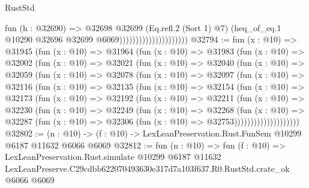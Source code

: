 \begin{lexlean}{RustStd}
\begin{coremodule}
                                          fun (h : @32690) =>
                                          @32698
                                            @32699
                                            (Eq.refl.{2} (Sort 1) @7)
                                            (heq_of_eq.{1}
                                              @10290
                                              @32696
                                              @32699
                                              @6069)))))))))))))))))))))
@32794 := fun (x : @10) =>
  @31945
    (fun (x : @10) =>
    @31964
      (fun (x : @10) =>
      @31983
        (fun (x : @10) =>
        @32002
          (fun (x : @10) =>
          @32021
            (fun (x : @10) =>
            @32040
              (fun (x : @10) =>
              @32059
                (fun (x : @10) =>
                @32078
                  (fun (x : @10) =>
                  @32097
                    (fun (x : @10) =>
                    @32116
                      (fun (x : @10) =>
                      @32135
                        (fun (x : @10) =>
                        @32154
                          (fun (x : @10) =>
                          @32173
                            (fun (x : @10) =>
                            @32192
                              (fun (x : @10) =>
                              @32211
                                (fun (x : @10) =>
                                @32230
                                  (fun (x : @10) =>
                                  @32249
                                    (fun (x : @10) =>
                                    @32268
                                      (fun (x : @10) =>
                                      @32287
                                        (fun (x : @10) =>
                                        @32306 (fun (x : @10) => @32753))))))))))))))))))))
@32802 := (n : @10) -> (f : @10) -> LexLeanPreservation.Rust.FunSem @10299 @6187 @11632 @6066 @6069
@32812 := fun (n : @10) =>
  fun (f : @10) =>
  LexLeanPreservation.Rust.simulate
    @10299
    @6187
    @11632
    LexLeanPreserve.C29cdbb622070493630e317d7a103f637.R0.RustStd.crate_ok
    @6066
    @6069
\end{coremodule}
\end{lexlean}
